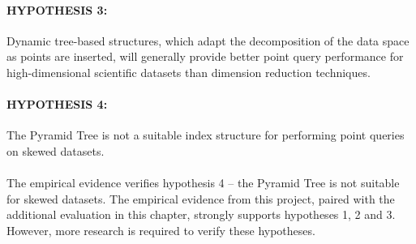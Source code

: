 \paragraph{\textbf{HYPOTHESIS 3:}} Dynamic tree-based structures, which adapt the decomposition of the data space as points are inserted, will generally provide better point query performance for high-dimensional scientific datasets than dimension reduction techniques.

\paragraph{\textbf{HYPOTHESIS 4:}} The Pyramid Tree is not a suitable index structure for performing point queries on skewed datasets.

\paragraph{}

The empirical evidence verifies hypothesis 4 -- the Pyramid Tree is not suitable for skewed datasets. The empirical evidence from this project, paired with the additional evaluation in this chapter, strongly supports hypotheses 1, 2 and 3. However, more research is required to verify these hypotheses.